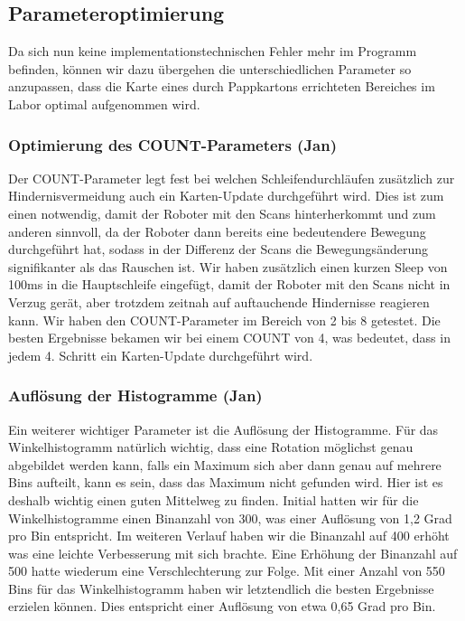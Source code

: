 \subsection{Parameteroptimierung}

Da sich nun keine implementationstechnischen Fehler mehr im Programm befinden, können wir dazu übergehen die unterschiedlichen Parameter so anzupassen, dass die Karte eines durch Pappkartons errichteten Bereiches im Labor optimal aufgenommen wird.

\subsubsection{Optimierung des COUNT-Parameters (Jan)}

Der COUNT-Parameter legt fest bei welchen Schleifendurchläufen zusätzlich zur Hindernisvermeidung auch ein Karten-Update durchgeführt wird. Dies ist zum einen notwendig, damit der Roboter mit den Scans hinterherkommt und zum anderen sinnvoll, da der Roboter dann bereits eine bedeutendere Bewegung durchgeführt hat, sodass in der Differenz der Scans die Bewegungsänderung signifikanter als das Rauschen ist. Wir haben zusätzlich einen kurzen Sleep von 100ms in die Hauptschleife eingefügt, damit der Roboter mit den Scans nicht in Verzug gerät, aber trotzdem zeitnah auf auftauchende Hindernisse reagieren kann.
Wir haben den COUNT-Parameter im Bereich von 2 bis 8 getestet. Die besten Ergebnisse bekamen wir bei einem COUNT von 4, was bedeutet, dass in jedem 4. Schritt ein Karten-Update durchgeführt wird.




\subsubsection{Auflösung der Histogramme (Jan)}

Ein weiterer wichtiger Parameter ist die Auflösung der Histogramme.
Für das Winkelhistogramm natürlich wichtig, dass eine Rotation möglichst genau abgebildet werden kann, falls ein Maximum sich aber dann genau auf mehrere Bins aufteilt, kann es sein, dass das Maximum nicht gefunden wird. Hier ist es deshalb wichtig einen guten Mittelweg zu finden. Initial hatten wir für die Winkelhistogramme einen Binanzahl von 300, was einer Auflösung von 1,2 Grad pro Bin entspricht. Im weiteren Verlauf haben wir die Binanzahl auf 400 erhöht was eine leichte Verbesserung mit sich brachte. Eine Erhöhung der Binanzahl auf 500 hatte wiederum eine Verschlechterung zur Folge. Mit einer Anzahl von 550 Bins für das Winkelhistogramm haben wir letztendlich die besten Ergebnisse erzielen können. Dies entspricht einer Auflösung von etwa 0,65 Grad pro Bin.

